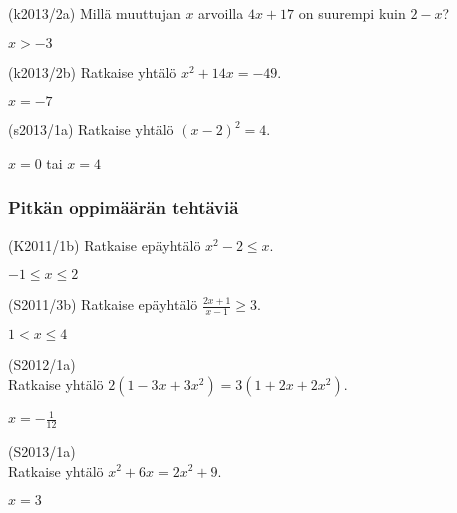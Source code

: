 \begin{tehtava}
(k2013/2a) Millä muuttujan $x$ arvoilla $4x+17$ on suurempi kuin $2-x$?
\begin{vastaus}
$x>-3$
\end{vastaus}
\end{tehtava}

\begin{tehtava}
(k2013/2b) Ratkaise yhtälö $x^2+14x=-49$.
\begin{vastaus}
$x=-7$
\end{vastaus}
\end{tehtava}

\begin{tehtava}
(s2013/1a) Ratkaise yhtälö $(x-2)^2=4$.
\begin{vastaus}
$x=0$ tai $x=4$ 
\end{vastaus}
\end{tehtava}

\subsubsection*{Pitkän oppimäärän tehtäviä}

\begin{tehtava}
(K2011/1b) Ratkaise epäyhtälö $x^2-2 \leq x$.
\begin{vastaus}
$-1 \leq x \leq 2$
\end{vastaus}
\end{tehtava}

\begin{tehtava}
  (S2011/3b) Ratkaise epäyhtälö $\frac{2x+1}{x-1} \geq 3$.
\begin{vastaus}
$1<x \leq 4$
\end{vastaus}
\end{tehtava}

\begin{tehtava}
(S2012/1a) \\ Ratkaise yhtälö $2(1-3x+3x^2) = 3(1+2x+2x^2)$.
\begin{vastaus}
$x=-\frac{1}{12}$
\end{vastaus}
\end{tehtava}

\begin{tehtava}
(S2013/1a) \\ Ratkaise yhtälö $x^2+6x=2x^2+9$.
\begin{vastaus}
$x=3$
\end{vastaus}
\end{tehtava}

